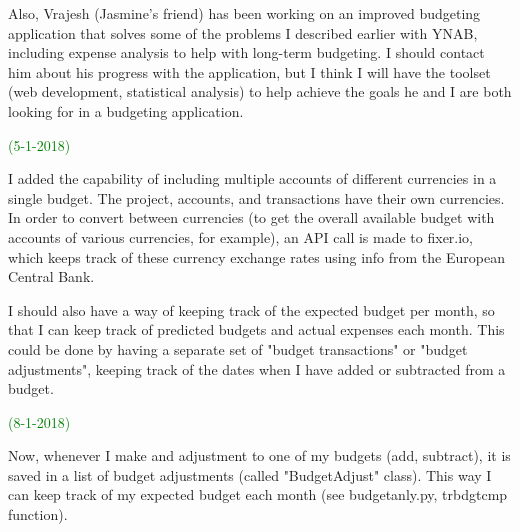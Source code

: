 \documentclass[11pt]{article}
\begin{document}
Also, Vrajesh (Jasmine's friend) has been working on an improved budgeting application that solves some of the problems I described earlier with YNAB, including expense analysis to help with long-term budgeting.  I should contact him about his progress with the application, but I think I will have the toolset (web development, statistical analysis) to help achieve the goals he and I are both looking for in a budgeting application.

\textcolor{green}{(5-1-2018)}

I added the capability of including multiple accounts of different currencies in a single budget.  The project, accounts, and transactions have their own currencies.  In order to convert between currencies (to get the overall available budget with accounts of various currencies, for example), an API call is made to fixer.io, which keeps track of these currency exchange rates using info from the European Central Bank.

I should also have a way of keeping track of the expected budget per month, so that I can keep track of predicted budgets and actual expenses each month.  This could be done by having a separate set of "budget transactions" or "budget adjustments", keeping track of the dates when I have added or subtracted from a budget.

\textcolor{green}{(8-1-2018)}

Now, whenever I make and adjustment to one of my budgets (add, subtract), it is saved in a list of budget adjustments (called "BudgetAdjust" class).  This way I can keep track of my expected budget each month (see budgetanly.py, trbdgtcmp function).
\end{document}
